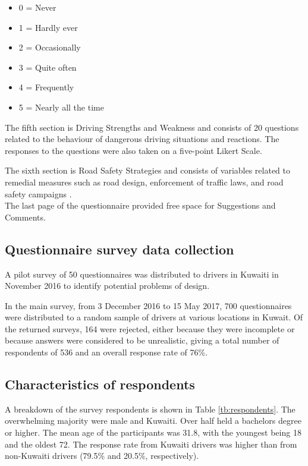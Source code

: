 \documentclass[preprint,12pt,a4paper,authoryear]{elsarticle}
\begin{document}
\begin{linenumbers}
\begin{itemize}
\item{0 = Never}
\item{1 = Hardly ever}
\item{2 = Occasionally}
\item{3 = Quite often}
\item{4 = Frequently}
\item{5 = Nearly all the time}
\end{itemize} 

The fifth section is Driving Strengths and Weakness and consists of 20 questions related to the behaviour of dangerous driving situations and reactions. The responses to the questions were also taken on a five-point Likert Scale.

The sixth section is Road Safety Strategies and consists of variables related to remedial measures such as road design, enforcement of traffic laws, and road safety campaigns .\\

The last page of the questionnaire provided free space for Suggestions and Comments. \\

\subsection{Questionnaire survey data collection}

A pilot survey of 50 questionnaires was distributed to drivers in Kuwaiti in November 2016 to identify potential problems of design. 

In the main survey, from 3 December 2016 to 15 May 2017, 700 questionnaires were distributed to a random sample of drivers at various locations in Kuwait.  Of the returned surveys, 164  were rejected, either because they were incomplete or because answers were considered to be unrealistic, giving a total number of respondents of 536 and an overall response rate of 76\%. 
        
\subsection{Characteristics of respondents}

A breakdown of the survey respondents is shown in Table \ref{tb:respondents}.  The overwhelming majority were male and Kuwaiti. Over half held a bachelors degree or higher.  The mean age of the participants was 31.8, with the youngest being 18 and the oldest 72. The response rate from Kuwaiti drivers was higher than from non-Kuwaiti drivers (79.5\% and 20.5\%, respectively). 


\end{linenumbers}
\end{document}
